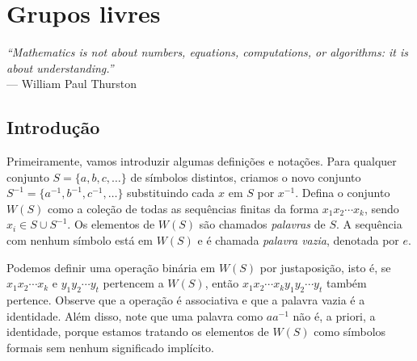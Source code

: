 \chapter[Grupos livres]{Grupos livres}
\label{cap-grupos-livres}
\chaptermark{}
%
\hfill%
\begin{minipage}{10cm}
\begin{flushright}
\rightskip=0.5cm
\textit{``Mathematics is not about numbers, equations, computations, or algorithms: it is about understanding.''}
\\[0.1cm]
\rightskip=0.5cm
--- William Paul Thurston
\end{flushright}
\end{minipage}

\section{Introdução}

    Primeiramente, vamos introduzir algumas definições e notações. Para qualquer conjunto 
    $S = \{ a, b, c, \dots \}$ de símbolos distintos, criamos o novo conjunto 
    $S^{-1} = \{ a^{-1}, b^{-1}, c^{-1}, \dots \}$ substituindo cada $x$ em $S$ por $x^{-1}$. 
    Defina o conjunto $W(S)$ como a coleção de todas as sequências finitas da forma $x_1x_2\cdots x_k$, 
    sendo $x_i\in S\cup S^{-1}$. Os elementos de $W(S)$ são chamados \textit{palavras} de $S$. 
    A sequência com nenhum símbolo está em $W(S)$ e é chamada \textit{palavra vazia}, denotada por $e$.
	
	\par\vspace{0.3cm} Podemos definir uma operação binária em $W(S)$ por justaposição, isto é, 
	se $x_1x_2\cdots x_k$ e $y_1y_2\cdots y_t$ pertencem a $W(S)$, então $x_1x_2\cdots x_ky_1y_2\cdots y_t$ 
	também pertence. Observe que a operação é associativa e que a palavra vazia é a identidade. 
	Além disso, note que uma palavra como $aa^{-1}$ não é, a priori, a identidade, porque estamos tratando 
	os elementos de $W(S)$ como símbolos formais sem nenhum significado implícito.
	
